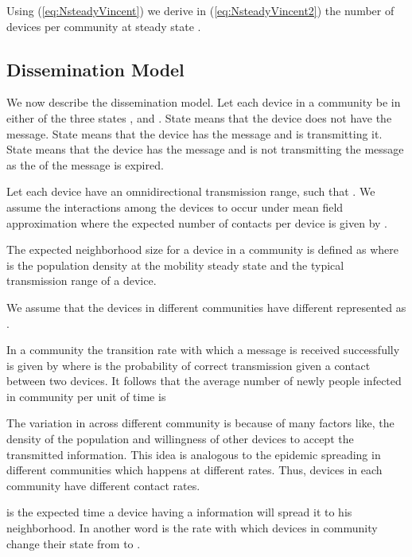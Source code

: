 \documentclass[review]{elsarticle}
\begin{document}
Using (\ref{eq:NsteadyVincent}) we derive in (\ref{eq:NsteadyVincent2}) the number of devices per community at steady state \cite{Sattenspiel1995}.


\subsection{Dissemination Model}\label{subsec:C3_dissmodel}
We now describe the dissemination model. Let each device in a community be in either of the three states ,  and . State  means that the device does not have the message. State  means that the device has the message and is transmitting it. State  means that the device has the message and is not transmitting the message as the  of the message is expired.

Let each device have an omnidirectional transmission range,  such that . We assume the interactions among the devices to occur under mean field approximation where the expected number of contacts per device is given by .
\begin{definition}\label{defavdeg}
The expected neighborhood size for a device in a community  is defined as  where  is the population density at the mobility steady state and  the typical transmission range of a device.
\end{definition}

We assume that the devices in different communities have different  represented as . 

\begin{definition}\label{defbeta}
In a community  the transition rate with which a message is received successfully is given by  where  is the probability of correct transmission given a contact between two devices. It follows that the average number of newly people infected in community  per unit of time is 
\end{definition}

The variation in  across different community is because of many factors like, the density of the population and willingness of other devices to accept the transmitted information. This idea is analogous to the epidemic spreading in different communities which happens at different rates. Thus, devices in each community have different contact rates.

\begin{definition}\label{defdelta}
 is the expected time a device having a information will spread it to his neighborhood. In another word  is the rate with which devices in community  change their state from  to .
\end{definition}
\end{document}
